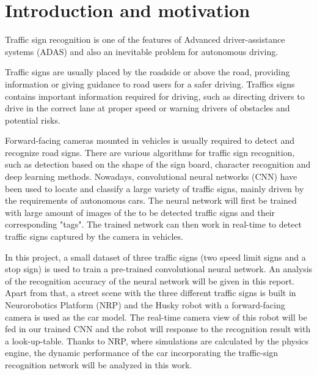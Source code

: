 
\section{Introduction and motivation}
Traffic sign recognition is one of the features of Advanced driver-assistance systems (ADAS) and also an inevitable problem for autonomous driving. 

Traffic signs are usually placed by the roadside or above the road, providing information or giving guidance to road users for a safer driving. Traffics signs contains important information required for driving, such as directing drivers to drive in the correct lane at proper speed or warning drivers of obstacles and potential risks. 

Forward-facing cameras mounted in vehicles is usually required to detect and recognize road signs. There are various algorithms for traffic sign recognition, such as detection based on the shape of the sign board, character recognition and deep learning methods.  Nowadays, convolutional neural networks (CNN) have been used to locate and classify a large variety of traffic signs, mainly driven by the requirements of autonomous cars. The neural network will first be trained with large amount of images of the to be detected traffic signs and their corresponding "tags". The trained network can then work in real-time to detect traffic signs captured by the camera in vehicles.

In this project, a small dataset of three traffic signs (two speed limit signs and a stop sign) is used to train a pre-trained convolutional neural network. An analysis of the recognition accuracy of the neural network will be given in this report. Apart from that, a street scene with the three different traffic signs is built in Neurorobotics Platform (NRP) and the Husky robot with a forward-facing camera is used as the car model. The real-time camera view of this robot will be fed in our trained CNN and the robot will response to the recognition result with a look-up-table. Thanks to NRP, where simulations are calculated by the physics engine, the dynamic performance of the car incorporating the traffic-sign recognition network will be analyzed in this work.